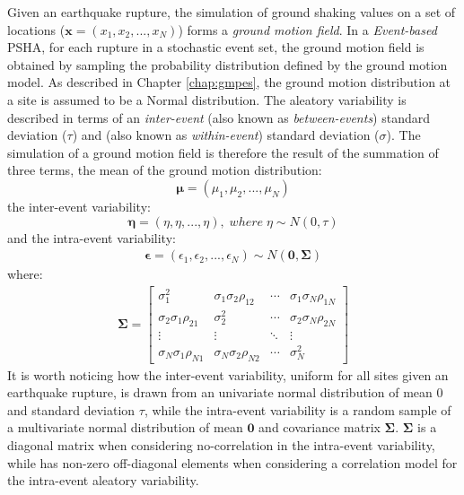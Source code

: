Given an earthquake rupture, the simulation of ground shaking values on a set of locations ($\bm{x}=(x_{1}, x_{2}, ..., x_{N})$)
forms a \textit{ground motion field}. In a \textit{Event-based} PSHA, for each rupture in a stochastic event set,
the ground motion field is obtained by sampling the probability distribution defined by the ground motion model.
As described in Chapter \ref{chap:gmpes}, the ground motion distribution at a site is assumed to be a Normal
distribution. The aleatory variability is described in terms of an \textit{inter-event} (also known as \textit{between-events})
standard deviation ($\tau$) and  (also known as \textit{within-event}) standard deviation ($\sigma$).
The simulation of a ground motion field is therefore the result of the summation of three terms, the mean of the
ground motion distribution:
\begin{equation}
\bm\mu = (\mu_{1}, \mu_{2}, ..., \mu_{N})
\end{equation}
the inter-event variability:
\begin{equation}
\bm\eta = (\eta, \eta, ..., \eta),\;where\;\eta\sim N(0, \tau)
\end{equation}
and the intra-event variability:
\begin{align}
\bm\epsilon = (\epsilon_{1}, \epsilon_{2}, ..., \epsilon_{N}) \sim N(\bm{0}, \bm\Sigma)
\end{align}
where:
\begin{align}
\bm\Sigma = 
\begin{bmatrix}
\sigma_{1}^2&\sigma_{1}\sigma_{2}\rho_{12}&\cdots &\sigma_{1}\sigma_{N}\rho_{1N} \\
\sigma_{2}\sigma_{1}\rho_{21}&\sigma_{2}^2&\cdots &\sigma_{2}\sigma_{N}\rho_{2N} \\
\vdots & \vdots & \ddots & \vdots\\
\sigma_{N}\sigma_{1}\rho_{N1}&\sigma_{N}\sigma_{2}\rho_{N2}&\cdots &\sigma_{N}^2
\end{bmatrix}
\end{align}
It is worth noticing how the inter-event variability, uniform for all sites given an earthquake rupture, is drawn
from an univariate normal distribution of mean 0 and standard deviation $\tau$, while the intra-event variability
is a random sample of a multivariate normal distribution of mean $\bm{0}$ and covariance matrix $\bm\Sigma$.
$\bm\Sigma$ is a diagonal matrix when considering no-correlation in the intra-event variability, while has non-zero
off-diagonal elements when considering a correlation model for the intra-event aleatory variability.

